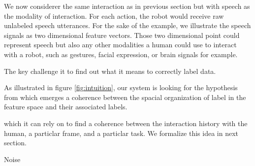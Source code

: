 We now considerer the same interaction as in previous section but with speech as the modality of interaction. For each action, the robot would receive raw unlabeled speech utterances. For the sake of the example, we illustrate the speech signals as two dimensional feature vectors. Those two dimensional point could represent speech but also any other modalities a human could use to interact with a robot, such as gestures, facial expression, or brain signals for example.



The key challenge it to find out what it means to correctly label data.

As illustrated in figure \ref{fig:intuition}, our system is looking for the hypothesis from which emerges a coherence between the spacial organization of label in the feature space and their associated labels.

which it can rely on to find a coherence between the interaction history with the human, a particlar frame, and a particlar task. We formalize this idea in next section.

Noise



